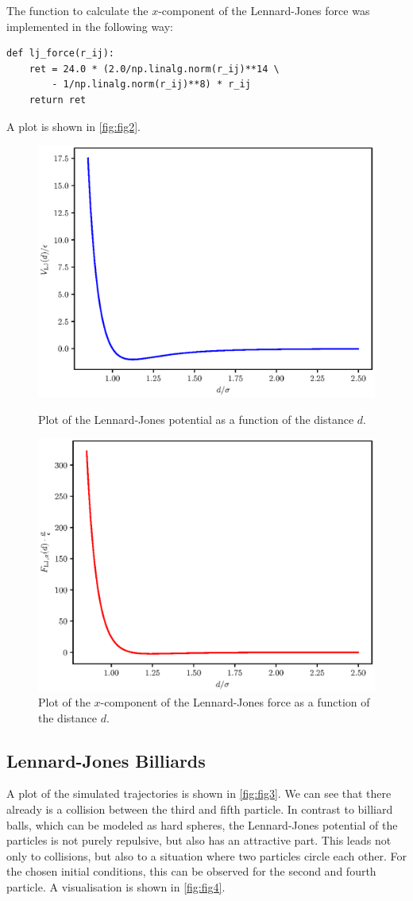 \documentclass[a4paper,10pt,bibtotoc]{scrartcl}
\begin{document}
The function to calculate the $x$-component of the Lennard-Jones force was implemented in the following way:
\begin{lstlisting}
def lj_force(r_ij):
    ret = 24.0 * (2.0/np.linalg.norm(r_ij)**14 \
        - 1/np.linalg.norm(r_ij)**8) * r_ij
    return ret
\end{lstlisting}
A plot is shown in \autoref{fig:fig2}.

\begin{figure}[H]
 \includegraphics[width=.8\linewidth]{lennard_jones_potential.eps}
 \caption{Plot of the Lennard-Jones potential as a function of the distance $d$.}
 \label{fig:fig1}
 \includegraphics[width=.8\linewidth]{lennard_jones_force.eps}
 \caption{Plot of the $x$-component of the Lennard-Jones force as a function of the distance $d$.}
 \label{fig:fig2}
\end{figure}

\subsection{Lennard-Jones Billiards}
A plot of the simulated trajectories is shown in \autoref{fig:fig3}.
We can see that there already is a collision between the third and fifth particle. 
In contrast to billiard balls, which can be modeled as hard spheres, the Lennard-Jones potential of the particles is not purely repulsive, but also has an attractive part. 
This leads not only to collisions, but also to a situation where two particles circle each other.
For the chosen initial conditions, this can be observed for the second and fourth particle.
A visualisation is shown in \autoref{fig:fig4}.
\end{document}
